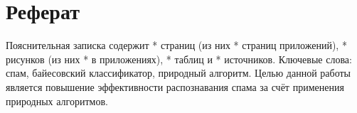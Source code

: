 \chapter*{Реферат}
\thispagestyle{plain}
Пояснительная записка содержит * страниц (из них * страниц приложений),
* рисунков (из них * в приложениях), * таблиц и * источников.
Ключевые слова: спам, байесовский классификатор,  природный алгоритм.
Целью данной работы является повышение эффективности распознавания спама
за счёт применения природных алгоритмов.
